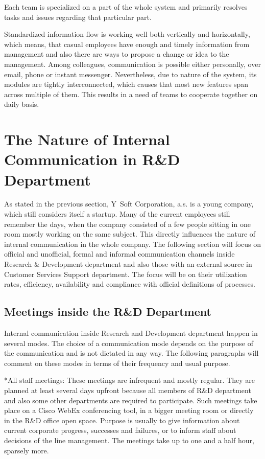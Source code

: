 \documentclass[11pt,singleside]{myfithesis2}
\makeatletter
\renewcommand\paragraph{
   \vspace{-10pt}
   \@startsection{paragraph}{4}{0mm}
      {\baselineskip}
      {- 5pt}
      {\normalfont\normalsize\bfseries}
}
\makeatother
\begin{document}
Each team is specialized on a part of the whole system and primarily resolves tasks and issues regarding that particular part. 

Standardized information flow is working well both vertically and horizontally, which means, that casual employees have enough and timely information from management and also there are ways to propose a change or idea to the management. Among colleagues, communication is possible either personally, over email, phone or instant messenger. Nevertheless, due to nature of the system, its modules are tightly interconnected, which causes that most new features span across multiple of them. This results in a need of teams to cooperate together on daily basis. 



	\section{The Nature of Internal Communication in R\&D Department}
As stated in the previous section, Y~Soft Corporation, a.s. is a young company, which still considers itself a startup. Many of the current employees still remember the days, when the company consisted of a few people sitting in one room mostly working on the same subject. This directly influences the nature of internal communication in the whole company. The following section will focus on official and unofficial, formal and informal communication channels inside Research \& Development department and also those with an external source in Customer Services Support department. The focus will be on their utilization rates, efficiency, availability and compliance with official definitions of processes.


		\subsection{Meetings inside the R\&D Department}\label{rndMeetings}
Internal communication inside Research and Development department happen in several modes. The choice of a communication mode depends on the purpose of the communication and is not dictated in any way. The following paragraphs will comment on these modes in terms of their frequency and usual purpose.

\paragraph*{All staff meetings: } These meetings are infrequent and mostly regular. They are planned at least several days upfront because all members of R\&D department and also some other departments are required to participate. Such meetings take place on a Cisco WebEx conferencing tool, in a bigger meeting room or directly in the R\&D office open space. Purpose is usually to give information about current corporate progress, successes and failures, or to inform staff about decisions of the line management. The meetings take up to one and a half hour, sparsely more.
\end{document}
